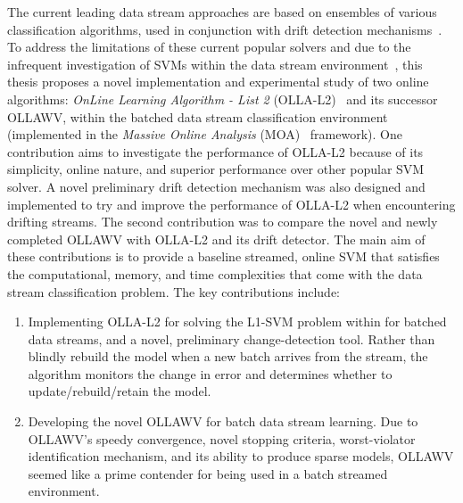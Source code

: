 \documentclass[reqno]{vcuthesis}
\newcommand{\iitem}{\item[-]}
\numberwithin{equation}{chapter}
\begin{document}
The current leading data stream approaches are based on ensembles of various classification algorithms, used in conjunction with drift detection mechanisms~\cite{bifet2009new,krawczyk2017ensemble}. To address the limitations of these current popular solvers and due to the infrequent investigation of SVMs within the data stream environment~\cite{aggarwal}, this thesis proposes a novel implementation and experimental study of two online algorithms: \textit{OnLine Learning Algorithm - List 2} (OLLA-L2)~\cite{kecman2016fast} and its successor OLLAWV, within the batched data stream classification environment (implemented in the \textit{Massive Online Analysis} (MOA)~\cite{moacite} framework). One contribution aims to investigate the performance of OLLA-L2 because of its simplicity, online nature, and superior performance over other popular SVM solver. A novel preliminary drift detection mechanism was also designed and implemented to try and improve the performance of OLLA-L2 when encountering drifting streams. The second contribution was to compare the novel and newly completed OLLAWV with OLLA-L2 and its drift detector. The main aim of these contributions is to provide a baseline streamed, online SVM that satisfies the computational, memory, and time complexities that come with the data stream classification problem. The key contributions include:
\begin{enumerate}
\iitem Implementing OLLA-L2 for solving the L1-SVM problem within for batched data streams, and a novel, preliminary change-detection tool. Rather than blindly rebuild the model when a new batch arrives from the stream, the algorithm monitors the change in error and determines whether to update/rebuild/retain the model.

\iitem Developing the novel OLLAWV for batch data stream learning. Due to OLLAWV's speedy convergence, novel stopping criteria, worst-violator identification mechanism, and its ability to produce sparse models, OLLAWV seemed like a prime contender for being used in a batch streamed environment.

\end{enumerate}
\end{document}
